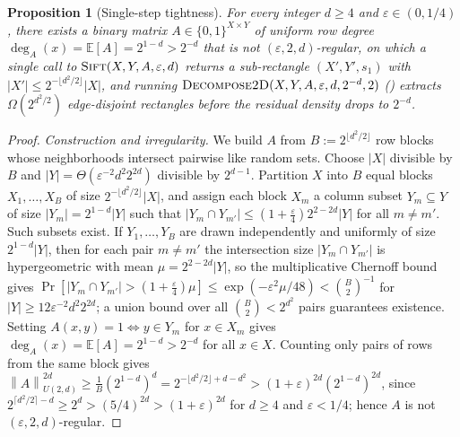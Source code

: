 \documentclass[11pt]{article}
\newtheorem{proposition}[theorem]{Proposition}
\theoremstyle{definition}
\renewcommand{\label}[1]{}%
\newcommand{\E}{\mathbb{E}}
\newcommand{\norm}[1]{\left\lVert #1 \right\rVert}
\newcommand{\abs}[1]{\left\lvert #1 \right\rvert}
\newcommand{\dens}[1]{\E[#1]}
\newcommand{\Sift}{\textnormal{\textsc{Sift}}}
\newcommand{\DecomposeTwoD}{\textnormal{\textsc{Decompose2D}}}
\begin{document}
\begin{proposition}[Single-step tightness]
\label{prop:tightness}
For every integer $d \ge 4$ and $\varepsilon \in (0, 1/4)$, there exists a binary matrix $A \in \{0, 1\}^{X \times Y}$ of uniform row degree $\deg_A(x) = \dens{A} = 2^{1-d} > 2^{-d}$ that is not $(\varepsilon, 2, d)$-regular, on which a single call to $\Sift(X, Y, A, \varepsilon, d)$ returns a sub-rectangle $(X', Y', s_1)$ with $\abs{X'} \le 2^{-\lfloor d^2/2 \rfloor}\abs{X}$, and running $\DecomposeTwoD(X, Y, A, \varepsilon, d, 2^{-d}, 2)$ () extracts $\Omega(2^{d^2/2})$ edge-disjoint rectangles before the residual density drops to $2^{-d}$.
\end{proposition}

\begin{proof}
\emph{Construction and irregularity.} We build $A$ from $B := 2^{\lfloor d^2/2 \rfloor}$ row blocks whose neighborhoods intersect pairwise like random sets. Choose $\abs{X}$ divisible by $B$ and $\abs{Y} = \Theta(\varepsilon^{-2} d^2 2^{2d})$ divisible by $2^{d-1}$. Partition $X$ into $B$ equal blocks $X_1, \dots, X_B$ of size $2^{-\lfloor d^2/2 \rfloor}\abs{X}$, and assign each block $X_m$ a column subset $Y_m \subseteq Y$ of size $\abs{Y_m} = 2^{1-d}\abs{Y}$ such that $\abs{Y_m \cap Y_{m'}} \le (1 + \frac{\varepsilon}{4})2^{2-2d}\abs{Y}$ for all $m \ne m'$. Such subsets exist. If $Y_1, \dots, Y_B$ are drawn independently and uniformly of size $2^{1-d}\abs{Y}$, then for each pair $m \ne m'$ the intersection size $\abs{Y_m \cap Y_{m'}}$ is hypergeometric with mean $\mu = 2^{2-2d}\abs{Y}$, so the multiplicative Chernoff bound gives $\Pr[\abs{Y_m \cap Y_{m'}} > (1 + \frac{\varepsilon}{4})\mu] \le \exp(-\varepsilon^2 \mu / 48) < \binom{B}{2}^{-1}$ for $\abs{Y} \ge 12\varepsilon^{-2} d^2 2^{2d}$; a union bound over all $\binom{B}{2} < 2^{d^2}$ pairs guarantees existence. Setting $A(x, y) = 1 \iff y \in Y_m$ for $x \in X_m$ gives $\deg_A(x) = \dens{A} = 2^{1-d} > 2^{-d}$ for all $x \in X$. Counting only pairs of rows from the same block gives $\norm{A}_{U(2, d)}^{2d} \ge \frac{1}{B}(2^{1-d})^d = 2^{-\lfloor d^2/2 \rfloor + d - d^2} > (1 + \varepsilon)^{2d}(2^{1-d})^{2d}$, since $2^{\lceil d^2/2 \rceil - d} \ge 2^d > (5/4)^{2d} > (1 + \varepsilon)^{2d}$ for $d \ge 4$ and $\varepsilon < 1/4$; hence $A$ is not $(\varepsilon, 2, d)$-regular.


\end{proof}
\end{document}
